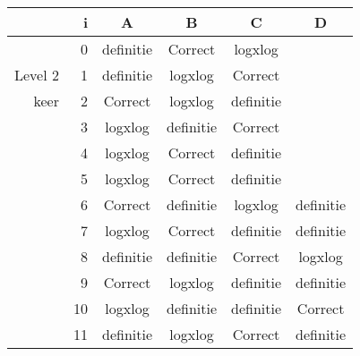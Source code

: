 \begin{tabular}{ rr| c|c|c|c}\hline\hline
     & i & \textbf{A} & \textbf{B} & \textbf{C} & \textbf{D}\\\hline

&0&definitie&Correct\cellcolor[gray]{0.6}&logxlog\\
Level 2 & 1&definitie&logxlog&Correct\cellcolor[gray]{0.6}\\
keer &2&Correct\cellcolor[gray]{0.6}&logxlog&definitie\\
&3&logxlog&definitie&Correct\cellcolor[gray]{0.6}\\
&4&logxlog&Correct\cellcolor[gray]{0.6}&definitie\\
&5&logxlog&Correct\cellcolor[gray]{0.6}&definitie\\
&6&Correct\cellcolor[gray]{0.6}&definitie&logxlog&definitie\\
&7&logxlog&Correct\cellcolor[gray]{0.6}&definitie&definitie\\
&8&definitie&definitie&Correct\cellcolor[gray]{0.6}&logxlog\\
&9&Correct\cellcolor[gray]{0.6}&logxlog&definitie&definitie\\
&10&logxlog&definitie&definitie&Correct\cellcolor[gray]{0.6}\\
&11&definitie&logxlog&Correct\cellcolor[gray]{0.6}&definitie\\
\hline\end{tabular}\par\ \newline

